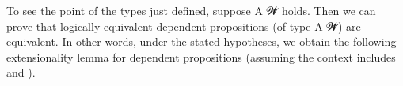 \ccpad
To see the point of the types just defined, suppose  \ab A \ab 𝓦 holds. Then we can prove that logically equivalent dependent propositions (of type  \ab A \ab 𝓦) are equivalent. In other words, under the stated hypotheses, we obtain the following  extensionality lemma for dependent propositions (assuming the context includes
\AgdaSpace{}%
\AgdaSymbol{:}\AgdaSpace{}%
\AgdaSpace{}%
\AgdaSpace{}%
\AgdaSpace{}%
and \AgdaSpace{}%
\AgdaSymbol{:}\AgdaSpace{}%
).
\ccpad
\begin{code}%
\>[1][@{}l@{\AgdaIndent{0}}]%
\>[2]\AgdaSpace{}%
\AgdaSymbol{:}\AgdaSpace{}%
\AgdaSpace{}%
\AgdaSpace{}%
\AgdaSpace{}%
\AgdaSpace{}%
\AgdaSymbol{\{}\AgdaSpace{}%
\AgdaSpace{}%
\AgdaSymbol{:}\AgdaSpace{}%
\AgdaSpace{}%
\AgdaSpace{}%
\AgdaSymbol{\}}\AgdaSpace{}%
\AgdaSpace{}%
\AgdaSpace{}%
\AgdaSpace{}%
\AgdaSpace{}%
\AgdaSpace{}%
\AgdaSpace{}%
\AgdaSpace{}%
\AgdaSpace{}%
\AgdaSpace{}%
\AgdaSpace{}%
\AgdaSpace{}%
\<%
\\
%
\>[2]\AgdaSpace{}%
\AgdaSpace{}%
\AgdaSpace{}%
\AgdaSymbol{=}\AgdaSpace{}%
%
\>[29]\AgdaSpace{}%
\AgdaSpace{}%
%
\>[38]\AgdaSpace{}%
\AgdaSpace{}%
\<%
\end{code}
